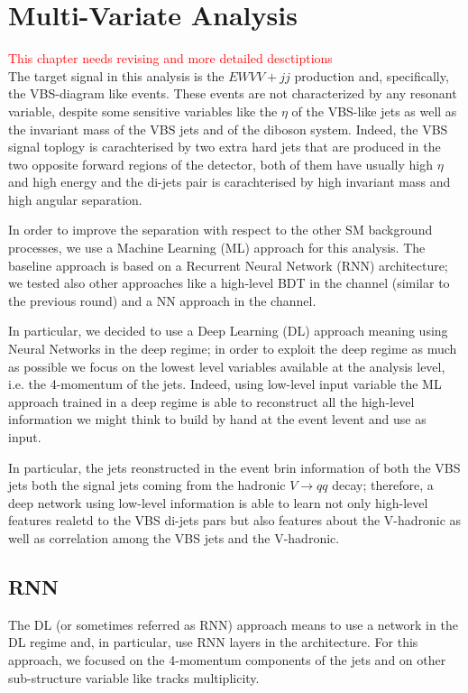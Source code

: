 \chapter{Multi-Variate Analysis}

\textcolor{red}{This chapter needs revising and more detailed desctiptions} \\
The target signal in this analysis is the $EW VV+jj$ production and, specifically, the VBS-diagram like events.
These events are not characterized by any resonant variable,
despite some sensitive variables like the $\eta$ of the VBS-like jets as well as
the invariant mass of the VBS jets and of the diboson system.
Indeed, the VBS signal toplogy is carachterised by two extra hard jets that are produced in the two opposite
forward regions of the detector, both of them have usually high $\eta$ and high energy
and the di-jets pair is carachterised by high invariant mass and high angular separation.

In order to improve the separation with respect to the other SM background processes,
we use a Machine Learning (ML) approach for this analysis.
The baseline approach is based on a Recurrent Neural Network (RNN) architecture;
we tested also other approaches like a high-level BDT in the \tlep channel (similar to the previous round)
and a NN approach in the \zlep channel.

In particular, we decided to use a Deep Learning (DL) approach meaning using Neural Networks in the deep regime;
in order to exploit the deep regime as much as possible we focus on the lowest level variables available
at the analysis level, i.e. the 4-momentum of the jets.
Indeed, using low-level input variable the ML approach trained in a deep regime is able to reconstruct all the
high-level information we might think to build by hand at the event levent and use as input.

In particular, the jets reonstructed in the event brin information of both the VBS jets both the signal jets
coming from the hadronic $V \rightarrow qq$ decay; therefore, a deep network using low-level information is able
to learn not only high-level features realetd to the VBS di-jets pars but also features about the V-hadronic
as well as correlation among the VBS jets and the V-hadronic.

\section{RNN}

The DL (or sometimes referred as RNN) approach means to use a network in the DL regime and, in particular, use RNN layers in the architecture. For this approach, we focused on the 4-momentum components of the jets and on other sub-structure variable like tracks multiplicity.

